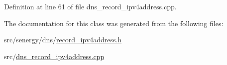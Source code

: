 Definition at line 61 of file dns\-\_\-record\-\_\-ipv4address.\-cpp.



The documentation for this class was generated from the following files\-:\begin{DoxyCompactItemize}
\item 
src/senergy/dns/\hyperlink{record__ipv4address_8h}{record\-\_\-ipv4address.\-h}\item 
src/\hyperlink{dns__record__ipv4address_8cpp}{dns\-\_\-record\-\_\-ipv4address.\-cpp}\end{DoxyCompactItemize}
